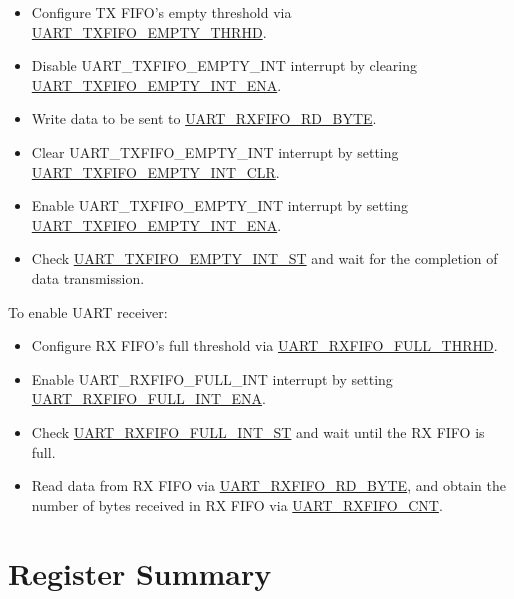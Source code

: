\documentclass[main\_\_EN.tex]{subfiles}
\begin{document}
\begin{itemize}
    \item Configure TX FIFO's empty threshold via \hyperref[fielddesc:UARTTXFIFOEMPTYTHRHD]{UART\_TXFIFO\_EMPTY\_THRHD}.
    \item Disable UART\_TXFIFO\_EMPTY\_INT interrupt by clearing \hyperref[fielddesc:UARTTXFIFOEMPTYINTENA]{UART\_TXFIFO\_EMPTY\_INT\_ENA}.
    \item Write data to be sent to \hyperref[fielddesc:UARTRXFIFORDBYTE]{UART\_RXFIFO\_RD\_BYTE}.
    \item Clear UART\_TXFIFO\_EMPTY\_INT interrupt by setting  \hyperref[fielddesc:UARTTXFIFOEMPTYINTCLR]{UART\_TXFIFO\_EMPTY\_INT\_CLR}.
    \item Enable UART\_TXFIFO\_EMPTY\_INT interrupt by setting \hyperref[fielddesc:UARTTXFIFOEMPTYINTENA]{UART\_TXFIFO\_EMPTY\_INT\_ENA}.
    \item Check \hyperref[fielddesc:UARTTXFIFOEMPTYINTST]{UART\_TXFIFO\_EMPTY\_INT\_ST} and wait for the completion of data transmission.
\end{itemize}

To enable UART receiver:
\begin{itemize}
    \item Configure RX FIFO's full threshold via \hyperref[fielddesc:UARTRXFIFOFULLTHRHD]{UART\_RXFIFO\_FULL\_THRHD}.
    \item Enable UART\_RXFIFO\_FULL\_INT interrupt by setting \hyperref[fielddesc:UARTRXFIFOFULLINTENA]{UART\_RXFIFO\_FULL\_INT\_ENA}.
    \item Check \hyperref[fielddesc:UARTRXFIFOFULLINTST]{UART\_RXFIFO\_FULL\_INT\_ST} and wait until the RX FIFO is full.
    \item Read data from RX FIFO via  \hyperref[fielddesc:UARTRXFIFORDBYTE]{UART\_RXFIFO\_RD\_BYTE}, and obtain the number of bytes received in RX FIFO via \hyperref[fielddesc:UARTRXFIFOCNT]{UART\_RXFIFO\_CNT}.
\end{itemize}




\clearpage
\section{Register Summary}
\label{sec:uart-reg-summ}
\hypertarget{uart-reg-summ}{}
\end{document}
